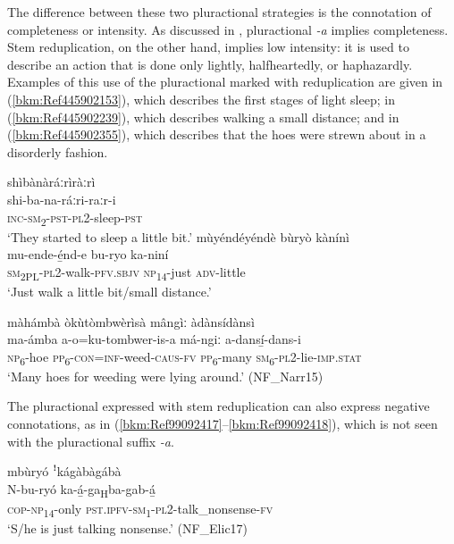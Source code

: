 The difference between these two pluractional strategies is the connotation of completeness or intensity. As discussed in , pluractional \textit{-a} implies completeness. Stem reduplication, on the other hand, implies low intensity: it is used to describe an action that is done only lightly, halfheartedly, or haphazardly. Examples of this use of the pluractional marked with reduplication are given in (\ref{bkm:Ref445902153}), which describes the first stages of light sleep; in (\ref{bkm:Ref445902239}), which describes walking a small distance; and in (\ref{bkm:Ref445902355}), which describes that the hoes were strewn about in a disorderly fashion.

\ea
\label{bkm:Ref445902153}
\glll shìbànàráːrìràːrì\\
shi-ba-na-ráːri-raːr-i\\
\textsc{inc}-\textsc{sm}\textsubscript{2}-\textsc{pst}-\textsc{pl}2-sleep-\textsc{pst} \\
\glt ‘They started to sleep a little bit.’
\z
\pagebreak
\ea
\label{bkm:Ref445902239}
mùyéndéyéndè bùryò kànínì\\
\gll mu-ende-é̲nd-e    bu-ryo  ka-niní\\
\textsc{sm}\textsubscript{2PL}-\textsc{pl}2-walk-\textsc{pfv}.\textsc{sbjv}  \textsc{np}\textsubscript{14}-just  \textsc{adv}-little\\
\glt ‘Just walk a little bit/small distance.’
\z

\ea
\label{bkm:Ref445902355}
màhámbà òkùtòmbwèrìsà mângìː àdànsídànsì\\
\gll ma-ámba  a-o=ku-tombwer-is-a    má-ngiː
a-dansí̲-dans-i \\
\textsc{np}\textsubscript{6}-hoe  \textsc{pp}\textsubscript{6}-\textsc{con}=\textsc{inf}-weed-\textsc{caus}-\textsc{fv}  \textsc{pp}\textsubscript{6}-many
\textsc{sm}\textsubscript{6}-\textsc{pl}2-lie-\textsc{imp}.\textsc{stat} \\
\glt ‘Many hoes for weeding were lying around.’ (NF\_Narr15)
\z

The pluractional expressed with stem reduplication can also express negative connotations, as in (\ref{bkm:Ref99092417}--\ref{bkm:Ref99092418}), which is not seen with the pluractional suffix \textit{-a}.

\ea
\label{bkm:Ref99092417}
mbùryó ꜝkágàbàgábà\\
\gll N-bu-ryó    ka-á̲-ga\textsubscript{H}ba-gab-á̲\\
\textsc{cop}-\textsc{np}\textsubscript{14}-only  \textsc{pst}.\textsc{ipfv}-\textsc{sm}\textsubscript{1}-\textsc{pl}2-talk\_nonsense-\textsc{fv} \\
\glt ‘S/he is just talking nonsense.’ (NF\_Elic17)
\z

